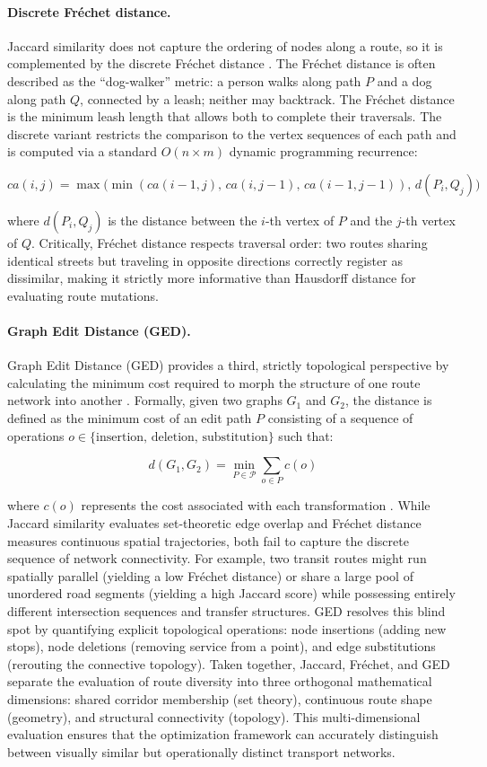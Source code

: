 {{\paragraph{Discrete Fréchet distance.}
Jaccard similarity does not capture the ordering of nodes along a route, so it is complemented by the discrete Fréchet distance \citep{eiter1994computing}. The Fréchet distance is often described as the ``dog-walker'' metric: a person walks along path $P$ and a dog along path $Q$, connected by a leash; neither may backtrack. The Fréchet distance is the minimum leash length that allows both to complete their traversals. The discrete variant restricts the comparison to the vertex sequences of each path and is computed via a standard $O(n \times m)$ dynamic programming recurrence:

\[
ca(i,j) = \max\!\bigl(\min(ca(i{-}1,j),\, ca(i,j{-}1),\, ca(i{-}1,j{-}1)),\,
             d(P_i, Q_j)\bigr)
\]

where $d(P_i, Q_j)$ is the distance between the $i$-th vertex of $P$ and the $j$-th vertex of $Q$. Critically, Fréchet distance respects traversal order: two routes sharing identical streets but traveling in opposite directions correctly register as dissimilar, making it strictly more informative than Hausdorff distance for evaluating route mutations.

\paragraph{Graph Edit Distance (GED).}
Graph Edit Distance (GED) provides a third, strictly topological perspective by calculating the minimum cost required to morph the structure of one route network into another \citep{sanfeliu1983distance}. Formally, given two graphs $G_1$ and $G_2$, the distance is defined as the minimum cost of an edit path $P$ consisting of a sequence of operations $o \in \{ \text{insertion, deletion, substitution} \}$ such that:

$$ d(G_1, G_2) = \min_{P \in \mathcal{P}} \sum_{o \in P} c(o) $$

where $c(o)$ represents the cost associated with each transformation \citep{sanfeliu1983distance}. While Jaccard similarity evaluates set-theoretic edge overlap and Fréchet distance measures continuous spatial trajectories, both fail to capture the discrete sequence of network connectivity. For example, two transit routes might run spatially parallel (yielding a low Fréchet distance) or share a large pool of unordered road segments (yielding a high Jaccard score) while possessing entirely different intersection sequences and transfer structures. GED resolves this blind spot by quantifying explicit topological operations: node insertions (adding new stops), node deletions (removing service from a point), and edge substitutions (rerouting the connective topology). Taken together, Jaccard, Fréchet, and GED separate the evaluation of route diversity into three orthogonal mathematical dimensions: shared corridor membership (set theory), continuous route shape (geometry), and structural connectivity (topology). This multi-dimensional evaluation ensures that the optimization framework can accurately distinguish between visually similar but operationally distinct transport networks.

}}
